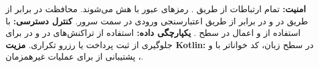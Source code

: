 
 \textbf{امنیت:} تمام ارتباطات از طریق . رمزهای عبور با  هش می‌شوند. محافظت در برابر  از طریق  در  و در برابر  از طریق اعتبارسنجی ورودی در سمت سرور.
 \textbf{کنترل دسترسی:}  با استفاده از  و اعمال  در سطح .
 \textbf{یکپارچگی داده:} استفاده از تراکنش‌های  در  و  در  برای جلوگیری از ثبت پرداخت یا رزرو تکراری.
 \textbf{مزیت Kotlin:}  در سطح زبان، کد خواناتر با  و ، پشتیبانی از  برای عملیات غیرهمزمان.
